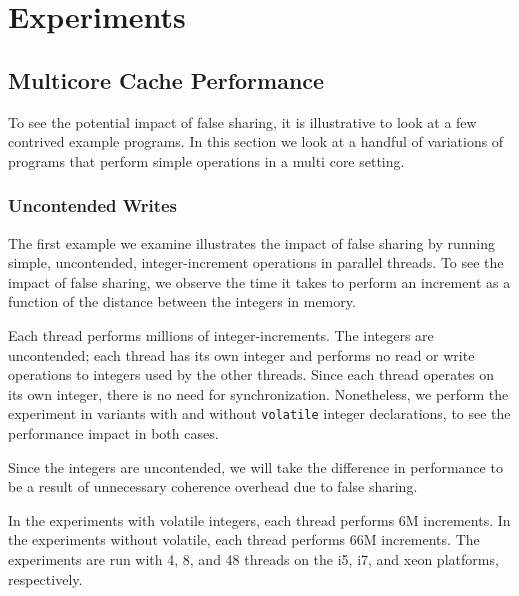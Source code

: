 \chapter{Experiments}
\label{sec:experiments}


\section{Multicore Cache Performance}

To see the potential impact of false sharing, it is illustrative to look at a
few contrived example programs. In this section we look at a handful of
variations of programs that perform simple operations in a multi core
setting.

\subsection{Uncontended Writes}
The first example we examine illustrates the impact of false sharing by running
simple, uncontended, integer-increment operations in parallel threads. To see
the impact of false sharing, we observe the time it takes to perform an
increment as a function of the distance between the integers in memory.


Each thread performs millions of integer-increments. The integers are
uncontended; each thread has its own integer and performs no read or write
operations to integers used by the other threads. Since each thread operates on
its own integer, there is no need for synchronization. Nonetheless, we perform
the experiment in variants with and without \texttt{volatile} integer declarations, to
see the performance impact in both cases.

Since the integers are uncontended, we will take the difference in performance
to be a result of unnecessary coherence overhead due to false sharing.

In the experiments with volatile integers, each thread performs 6M increments.
In the experiments without volatile, each thread performs 66M increments. The
experiments are run with 4, 8, and 48 threads on the i5, i7, and xeon platforms,
respectively.

